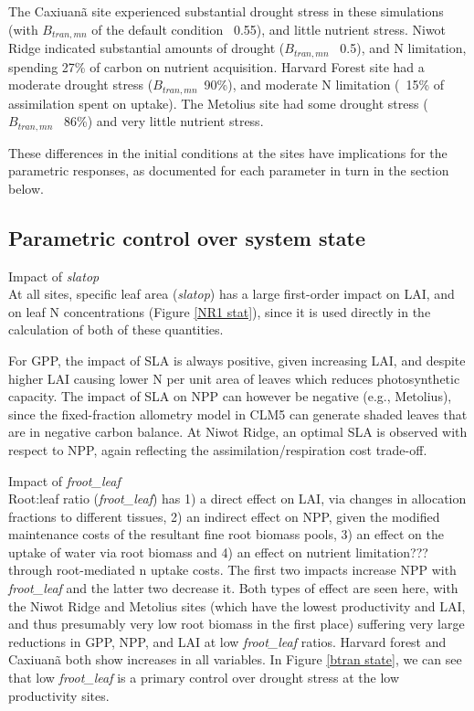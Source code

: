 \documentclass[draft,linenumbers]{agujournal}
\begin{document}
The Caxiuan\~a site experienced substantial drought stress in these simulations (with $B_{tran,mn}$ of the default condition ~0.55), and little nutrient stress. Niwot Ridge indicated substantial amounts of drought ($B_{tran,mn}$ ~0.5), and N limitation, spending 27\% of carbon on nutrient acquisition. Harvard Forest site had a moderate drought stress ($B_{tran,mn}$~90\%), and moderate N limitation (~15\% of assimilation spent on uptake). The Metolius site had some drought stress ($B_{tran,mn}$ ~86\%) and very little nutrient stress. 

These differences in the initial conditions at the sites have implications for the parametric responses, as documented for each parameter in turn in the section below. 

\subsection{Parametric control over system state}

Impact of \emph{slatop}\\
At all sites, specific leaf area (\emph{slatop}) has a large first-order impact on LAI,  and on leaf N concentrations (Figure \ref{NR1 stat}), since it is used directly in the calculation of both of these quantities. 

For GPP, the impact of SLA is always positive, given increasing LAI, and despite higher LAI causing lower N per unit area of leaves which reduces photosynthetic capacity. The impact of SLA on NPP can however be negative (e.g., Metolius), since the fixed-fraction allometry model in CLM5 can generate shaded leaves that are in negative carbon balance. At Niwot Ridge, an optimal SLA is observed with respect to NPP, again reflecting the assimilation/respiration cost trade-off.

Impact of \emph{froot\_leaf}\\
Root:leaf ratio (\emph{froot\_leaf}) has 1) a direct effect on LAI, via changes in allocation fractions to different tissues, 2) an indirect effect on NPP, given the modified maintenance costs of the resultant fine root biomass pools, 3) an effect on the uptake of water via root biomass and 4) an effect on nutrient limitation??? through root-mediated n uptake costs.  The first two impacts increase NPP with \emph{froot\_leaf} and the latter two decrease it.  Both types of effect are seen here, with the Niwot Ridge and Metolius sites (which have the lowest productivity and LAI, and thus presumably very low root biomass in the first place) suffering very large reductions in GPP, NPP, and LAI at low \emph{froot\_leaf} ratios.  Harvard forest and Caxiuan\~a both show increases in all variables.  In Figure \ref{btran state}, we can see that low \emph{froot\_leaf} is a primary control over drought stress at the low productivity sites. 
\end{document}

